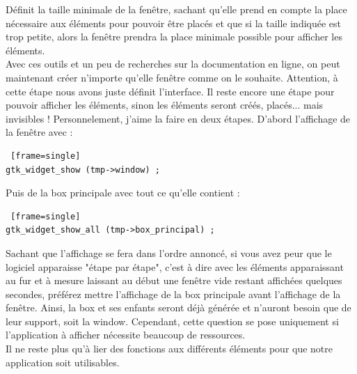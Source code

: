 \documentclass[11pt,french,a4paper]{report}
\begin{document}
Définit la taille minimale de la fenêtre, sachant qu'elle prend en compte la place nécessaire aux éléments pour pouvoir 
être placés et que si la taille indiquée est trop petite, alors la fenêtre prendra la place minimale possible 
pour afficher les éléments. \\
Avec ces outils et un peu de recherches sur la documentation en ligne, on peut maintenant créer n'importe qu'elle fenêtre 
comme on le souhaite. 
Attention, à cette étape nous avons juste définit l'interface. Il reste encore une étape pour pouvoir afficher les éléments, sinon
les éléments seront créés, placés... mais invisibles ! 
Personnelement, j'aime la faire en deux étapes. D'abord l'affichage de la fenêtre avec : \\
\begin{lstlisting} [frame=single]
gtk_widget_show (tmp->window) ;
\end{lstlisting}
Puis de la box principale avec tout ce qu'elle contient : \\
\begin{lstlisting} [frame=single]
gtk_widget_show_all (tmp->box_principal) ; 
\end{lstlisting}
Sachant que l'affichage se fera dans l'ordre annoncé, si vous avez peur que le logiciel apparaisse "étape par étape", c'est à 
dire avec les éléments apparaissant au fur et à mesure laissant au début une fenêtre vide restant affichées quelques secondes, 
préférez mettre l'affichage de la box principale avant l'affichage de la fenêtre. Ainsi, la box et ses enfants seront déjà générée 
et n'auront besoin que de leur support, soit la window. Cependant, cette question se pose uniquement si l'application 
à afficher nécessite beaucoup de ressources. \\
Il ne reste plus qu'à lier des fonctions aux différents éléments pour que notre application soit utilisables.\\
        
\end{document}
